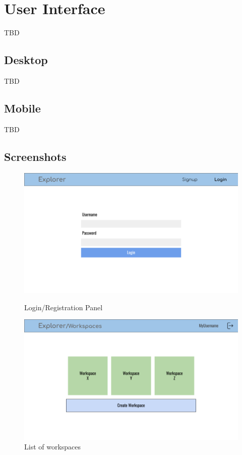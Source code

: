 \section{User Interface}
TBD

\subsection{Desktop}
TBD

\subsection{Mobile}
TBD

\subsection{Screenshots}

\begin{figure}[h]
    \centering
    \begin{minipage}{.4\textwidth}
        \centering
        \includegraphics[width = \textwidth]{mockups/1.png}
        \caption{Login/Registration Panel}
        \label{fig:login}
    \end{minipage}
    \hfill
    \begin{minipage}{.4\textwidth}
        \centering
        \includegraphics[width = \textwidth]{mockups/2.png}
        \caption{List of workspaces}
        \label{fig:workspaces-list}
    \end{minipage}
\end{figure}

